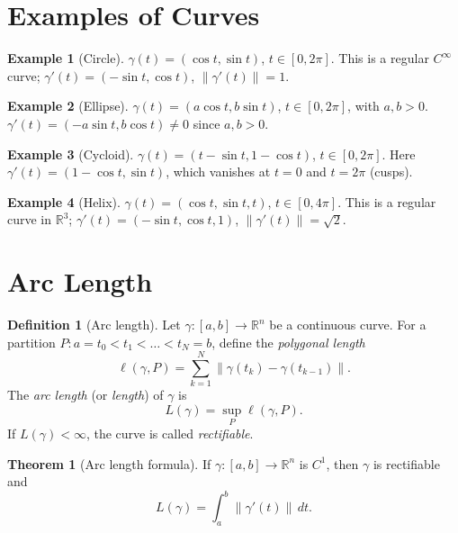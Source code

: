\documentclass[12pt,a4paper]{book}
\theoremstyle{definition}
\newtheorem{definition}{Definition}[chapter]
\newtheorem{theorem}{Theorem}[chapter]
\newtheorem{example}{Example}[chapter]
\begin{document}
\section{Examples of Curves}
\label{sec:curve-examples}

\begin{example}[Circle]
\label{ex:circle}
$\gamma(t)=(\cos t,\sin t)$, $t\in[0,2\pi]$.  This is a regular $C^\infty$
curve; $\gamma'(t)=(-\sin t,\cos t)$, $\|\gamma'(t)\|=1$.
\end{example}

\begin{example}[Ellipse]
\label{ex:ellipse}
$\gamma(t)=(a\cos t,b\sin t)$, $t\in[0,2\pi]$, with $a,b>0$.
$\gamma'(t)=(-a\sin t,b\cos t)\ne 0$ since $a,b>0$.
\end{example}

\begin{example}[Cycloid]
\label{ex:cycloid}
$\gamma(t)=(t-\sin t,1-\cos t)$, $t\in[0,2\pi]$.  Here
$\gamma'(t)=(1-\cos t,\sin t)$, which vanishes at $t=0$ and $t=2\pi$
(cusps).
\end{example}

\begin{example}[Helix]
\label{ex:helix}
$\gamma(t)=(\cos t,\sin t,t)$, $t\in[0,4\pi]$.  This is a regular curve in
$\mathbb{R}^3$; $\gamma'(t)=(-\sin t,\cos t,1)$,
$\|\gamma'(t)\|=\sqrt{2}$.
\end{example}

\section{Arc Length}
\label{sec:arc-length}

\begin{definition}[Arc length]\label{def:arc-length}
Let $\gamma\colon[a,b]\to\mathbb{R}^n$ be a continuous curve.  For a
partition $P\colon a=t_0<t_1<\dots<t_N=b$, define the \emph{polygonal
length}
\[
  \ell(\gamma,P)=\sum_{k=1}^N\|\gamma(t_k)-\gamma(t_{k-1})\|.
\]
The \emph{arc length} (or \emph{length}) of $\gamma$ is
\[
  L(\gamma)=\sup_P \ell(\gamma,P).
\]
If $L(\gamma)<\infty$, the curve is called \emph{rectifiable}.
\end{definition}

\begin{theorem}[Arc length formula]
\label{thm:arc-length-formula}
If $\gamma\colon[a,b]\to\mathbb{R}^n$ is $C^1$, then $\gamma$ is rectifiable
and
\[
  L(\gamma)=\int_a^b\|\gamma'(t)\|\,dt.
\]
\end{theorem}
\end{document}
